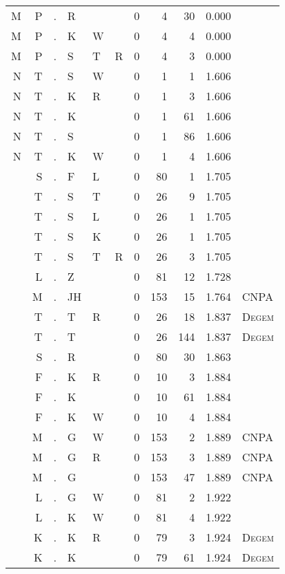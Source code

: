 \begin{longtable}{r@{ } r@{ } c@{ } l@{ } l@{ } l@{ } r r r r l }
M & P & . & R &   &   & 0 & 4 & 30 & 0.000 &  \\
M & P & . & K & W &   & 0 & 4 & 4 & 0.000 &  \\
M & P & . & S & T & R & 0 & 4 & 3 & 0.000 &  \\
N & T & . & S & W &   & 0 & 1 & 1 & 1.606 &  \\
N & T & . & K & R &   & 0 & 1 & 3 & 1.606 &  \\
N & T & . & K &   &   & 0 & 1 & 61 & 1.606 &  \\
N & T & . & S &   &   & 0 & 1 & 86 & 1.606 &  \\
N & T & . & K & W &   & 0 & 1 & 4 & 1.606 &  \\
  & S & . & F & L &   & 0 & 80 & 1 & 1.705 &  \\
  & T & . & S & T &   & 0 & 26 & 9 & 1.705 &  \\
  & T & . & S & L &   & 0 & 26 & 1 & 1.705 &  \\
  & T & . & S & K &   & 0 & 26 & 1 & 1.705 &  \\
  & T & . & S & T & R & 0 & 26 & 3 & 1.705 &  \\
  & L & . & Z &   &   & 0 & 81 & 12 & 1.728 &  \\
  & M & . & JH &   &   & 0 & 153 & 15 & 1.764 & \textsc{CNPA} \\
  & T & . & T & R &   & 0 & 26 & 18 & 1.837 & \textsc{Degem} \\
  & T & . & T &   &   & 0 & 26 & 144 & 1.837 & \textsc{Degem} \\
  & S & . & R &   &   & 0 & 80 & 30 & 1.863 &  \\
  & F & . & K & R &   & 0 & 10 & 3 & 1.884 &  \\
  & F & . & K &   &   & 0 & 10 & 61 & 1.884 &  \\
  & F & . & K & W &   & 0 & 10 & 4 & 1.884 &  \\
  & M & . & G & W &   & 0 & 153 & 2 & 1.889 & \textsc{CNPA} \\
  & M & . & G & R &   & 0 & 153 & 3 & 1.889 & \textsc{CNPA} \\
  & M & . & G &   &   & 0 & 153 & 47 & 1.889 & \textsc{CNPA} \\
  & L & . & G & W &   & 0 & 81 & 2 & 1.922 &  \\
  & L & . & K & W &   & 0 & 81 & 4 & 1.922 &  \\
  & K & . & K & R &   & 0 & 79 & 3 & 1.924 & \textsc{Degem} \\
  & K & . & K &   &   & 0 & 79 & 61 & 1.924 & \textsc{Degem} \\

\end{longtable}
